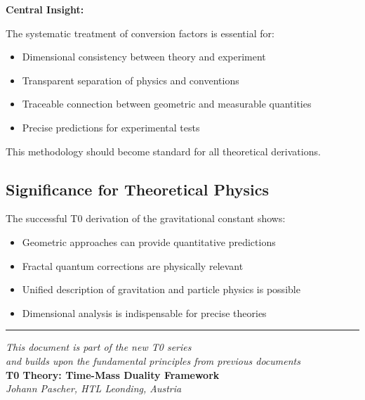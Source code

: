 \documentclass[12pt,a4paper]{article}
\begin{document}
	\begin{keyresult}
		\textbf{Central Insight:}
		
		The systematic treatment of conversion factors is essential for:
		\begin{itemize}
			\item Dimensional consistency between theory and experiment
			\item Transparent separation of physics and conventions
			\item Traceable connection between geometric and measurable quantities
			\item Precise predictions for experimental tests
		\end{itemize}
		
		This methodology should become standard for all theoretical derivations.
	\end{keyresult}
	
	\subsection{Significance for Theoretical Physics}
	
	The successful T0 derivation of the gravitational constant shows:
	\begin{itemize}
		\item Geometric approaches can provide quantitative predictions
		\item Fractal quantum corrections are physically relevant
		\item Unified description of gravitation and particle physics is possible
		\item Dimensional analysis is indispensable for precise theories
	\end{itemize}
	
	\begin{center}
		\hrule
		\vspace{0.5cm}
		\textit{This document is part of the new T0 series}\\
		\textit{and builds upon the fundamental principles from previous documents}\\
		\vspace{0.3cm}
		\textbf{T0 Theory: Time-Mass Duality Framework}\\
		\textit{Johann Pascher, HTL Leonding, Austria}\\
	\end{center}
	
\end{document}
